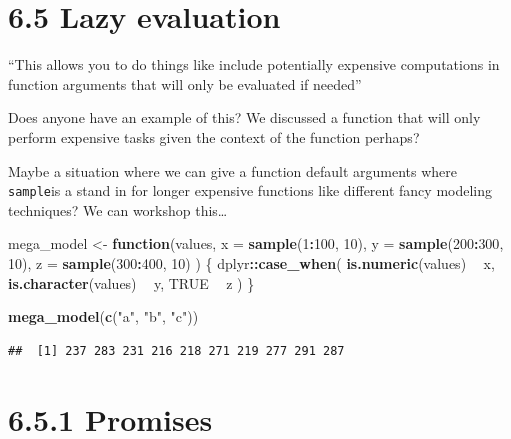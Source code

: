 \documentclass[]{book}
\newenvironment{Shaded}{\begin{snugshade}}{\end{snugshade}}
\newcommand{\ControlFlowTok}[1]{\textcolor[rgb]{0.13,0.29,0.53}{\textbf{#1}}}
\newcommand{\DataTypeTok}[1]{\textcolor[rgb]{0.13,0.29,0.53}{#1}}
\newcommand{\DecValTok}[1]{\textcolor[rgb]{0.00,0.00,0.81}{#1}}
\newcommand{\KeywordTok}[1]{\textcolor[rgb]{0.13,0.29,0.53}{\textbf{#1}}}
\newcommand{\NormalTok}[1]{#1}
\newcommand{\OperatorTok}[1]{\textcolor[rgb]{0.81,0.36,0.00}{\textbf{#1}}}
\newcommand{\OtherTok}[1]{\textcolor[rgb]{0.56,0.35,0.01}{#1}}
\newcommand{\StringTok}[1]{\textcolor[rgb]{0.31,0.60,0.02}{#1}}
\begin{document}
\hypertarget{lazy-evaluation}{%
\section*{6.5 Lazy evaluation}\label{lazy-evaluation}}

``This allows you to do things like include potentially expensive computations in function arguments that will only be evaluated if needed''

Does anyone have an example of this? We discussed a function that will only perform expensive tasks given the context of the function perhaps?

Maybe a situation where we can give a function default arguments where \texttt{sample}is a stand in for longer expensive functions like different fancy modeling techniques? We can workshop this\ldots{}

\begin{Shaded}
\begin{Highlighting}[]
\NormalTok{mega_model <-}\StringTok{ }\ControlFlowTok{function}\NormalTok{(values, }\DataTypeTok{x =} \KeywordTok{sample}\NormalTok{(}\DecValTok{1}\OperatorTok{:}\DecValTok{100}\NormalTok{, }\DecValTok{10}\NormalTok{), }\DataTypeTok{y =} \KeywordTok{sample}\NormalTok{(}\DecValTok{200}\OperatorTok{:}\DecValTok{300}\NormalTok{, }\DecValTok{10}\NormalTok{), }\DataTypeTok{z =} \KeywordTok{sample}\NormalTok{(}\DecValTok{300}\OperatorTok{:}\DecValTok{400}\NormalTok{, }\DecValTok{10}\NormalTok{)}
\NormalTok{) \{}
\NormalTok{  dplyr}\OperatorTok{::}\KeywordTok{case_when}\NormalTok{(}
    \KeywordTok{is.numeric}\NormalTok{(values) }\OperatorTok{~}\StringTok{ }\NormalTok{x,}
    \KeywordTok{is.character}\NormalTok{(values) }\OperatorTok{~}\StringTok{ }\NormalTok{y,}
    \OtherTok{TRUE} \OperatorTok{~}\StringTok{ }\NormalTok{z}
\NormalTok{  )}
\NormalTok{\}}

\KeywordTok{mega_model}\NormalTok{(}\KeywordTok{c}\NormalTok{(}\StringTok{"a"}\NormalTok{, }\StringTok{"b"}\NormalTok{, }\StringTok{"c"}\NormalTok{))}
\end{Highlighting}
\end{Shaded}

\begin{verbatim}
##  [1] 237 283 231 216 218 271 219 277 291 287
\end{verbatim}

\hypertarget{promises}{%
\section*{6.5.1 Promises}\label{promises}}
\end{document}
